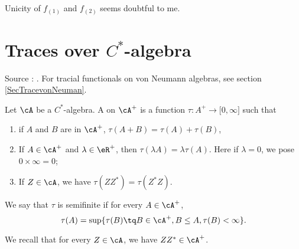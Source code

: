 \begin{probleme}
	Unicity of $f_{(1)}$ and $f_{(2)}$ seems doubtful to me.
\end{probleme}


\section{Traces over $C^*$-algebra }
\label{SecTraceCstar}

Source : \cite{DixmierTrace}. For tracial functionals on von Neumann algebras, see section \ref{SecTracevonNeuman}.

\begin{definition}
    Let $\cA$ be a $C^*$-algebra. A  on $\cA^+$ is a function $\tau\colon A^+\to \mathopen[ 0 , \infty \mathclose]$ such that
    \begin{enumerate}
        \item
            if $A$ and $B$ are in $\cA^+$, $\tau(A+B)=\tau(A)+\tau(B)$,
        \item
            If $A\in\cA^+$ and $\lambda\in\eR^+$, then $\tau(\lambda A)=\lambda\tau(A)$. Here if $\lambda=0$, we pose $0\times\infty=0$;
        \item
            If $Z\in\cA$, we have $\tau(ZZ^*)=\tau(Z^*Z)$.
    \end{enumerate}
    We say that $\tau$ is semifinite if for every $A\in\cA^+$,
    \begin{equation}
        \tau(A)=\sup\{ \tau(B)\tq B\in\cA^+,B\leq A,\tau(B)<\infty \}.
    \end{equation}
\end{definition}
We recall that for every $Z\in\cA$, we have $ZZ^*\in\cA^+$.

